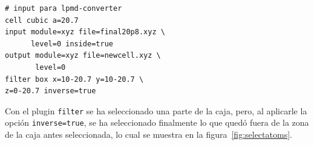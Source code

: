 \begin{multicols}{2}
\setlength{\columnseprule}{.5pt}
\begin{verbatim}
# input para lpmd-converter
cell cubic a=20.7
input module=xyz file=final20p8.xyz \
      level=0 inside=true
output module=xyz file=newcell.xyz \
       level=0
filter box x=10-20.7 y=10-20.7 \
z=0-20.7 inverse=true

\end{verbatim}
\end{multicols}

Con el plugin \verb|filter| se ha seleccionado una parte de la caja, pero, al aplicarle la opci\'on \verb|inverse=true|, se ha seleccionado finalmente lo que qued\'o fuera de la zona de la caja antes seleccionada, lo cual se muestra en la figura~\ref{fig:selectatoms}. 

